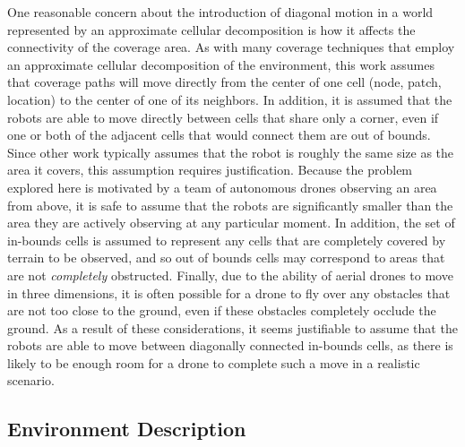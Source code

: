 One reasonable concern about the introduction of diagonal motion in a world represented by an approximate cellular decomposition is how it affects the connectivity of the coverage area. As with many coverage techniques that employ an approximate cellular decomposition of the environment, this work assumes that coverage paths will move directly from the center of one cell (node, patch, location) to the center of one of its neighbors. In addition, it is assumed that the robots are able to move directly between cells that share only a corner, even if one or both of the adjacent cells that would connect them are out of bounds. Since other work typically assumes that the robot is roughly the same size as the area it covers, this assumption requires justification. Because the problem explored here is motivated by a team of autonomous drones observing an area from above, it is safe to assume that the robots are significantly smaller than the area they are actively observing at any particular moment. In addition, the set of in-bounds cells is assumed to represent any cells that are completely covered by terrain to be observed, and so out of bounds cells may correspond to areas that are not \textit{completely} obstructed. Finally, due to the ability of aerial drones to move in three dimensions, it is often possible for a drone to fly over any obstacles that are not too close to the ground, even if these obstacles completely occlude the ground. As a result of these considerations, it seems justifiable to assume that the robots are able to move between diagonally connected in-bounds cells, as there is likely to be enough room for a drone to complete such a move in a realistic scenario.


\subsection{Environment Description}

